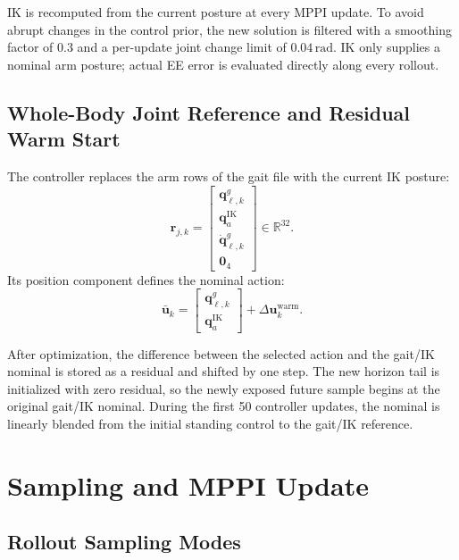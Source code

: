 \documentclass[11pt,a4paper]{article}
\newcommand{\R}{\mathbb{R}}
\begin{document}
IK is recomputed from the current posture at every MPPI update. To avoid
abrupt changes in the control prior, the new solution is filtered with a
smoothing factor of $0.3$ and a per-update joint change limit of
$0.04\,\mathrm{rad}$. IK only supplies a nominal arm posture; actual EE error
is evaluated directly along every rollout.

\subsection{Whole-Body Joint Reference and Residual Warm Start}

The controller replaces the arm rows of the gait file with the current IK
posture:
\begin{equation}
  \bm{r}_{j,k}=
  \begin{bmatrix}
    \bm{q}^{g}_{\ell,k}\\
    \bm{q}^{\mathrm{IK}}_a\\
    \dot{\bm{q}}^{g}_{\ell,k}\\
    \bm{0}_4
  \end{bmatrix}
  \in\R^{32}.
\end{equation}
Its position component defines the nominal action:
\begin{equation}
  \bar{\bm{u}}_k=
  \begin{bmatrix}
    \bm{q}^{g}_{\ell,k}\\
    \bm{q}^{\mathrm{IK}}_a
  \end{bmatrix}
  +\Delta\bm{u}^{\mathrm{warm}}_k.
\end{equation}

After optimization, the difference between the selected action and the
gait/IK nominal is stored as a residual and shifted by one step. The new
horizon tail is initialized with zero residual, so the newly exposed future
sample begins at the original gait/IK nominal. During the first 50 controller
updates, the nominal is linearly blended from the initial standing control to
the gait/IK reference.

\section{Sampling and MPPI Update}

\subsection{Rollout Sampling Modes}
\end{document}
